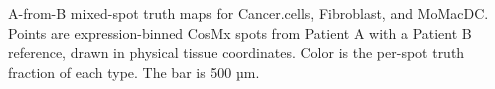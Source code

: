 A-from-B mixed-spot truth maps for Cancer.cells, Fibroblast, and MoMacDC. Points are expression-binned CosMx spots from Patient A with a Patient B reference, drawn in physical tissue coordinates. Color is the per-spot truth fraction of each type. The bar is 500 µm.
